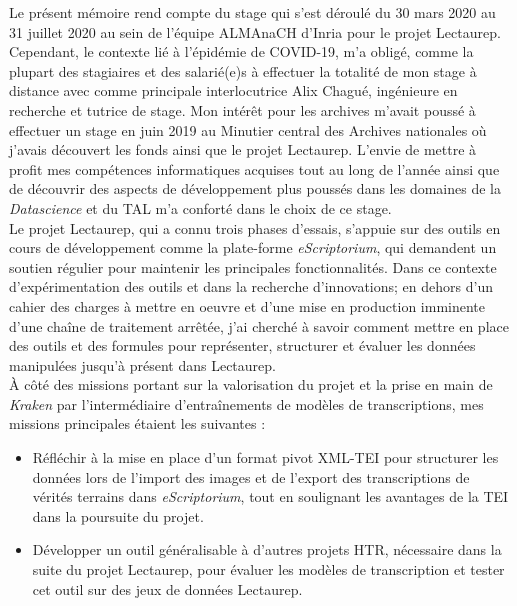 Le présent mémoire rend compte du stage qui s'est déroulé du 30 mars 2020 au 31 juillet 2020 au sein de l'équipe ALMAnaCH d'Inria pour le projet Lectaurep. Cependant, le contexte lié à l'épidémie de COVID-19, m'a obligé, comme la plupart des stagiaires et des salarié(e)s à effectuer la totalité de mon stage à distance avec comme principale interlocutrice Alix Chagué, ingénieure en recherche et tutrice de stage. Mon intérêt pour les archives m'avait poussé à effectuer un stage en juin 2019 au Minutier central des Archives nationales où j'avais découvert les fonds ainsi que le projet Lectaurep. L'envie de mettre à profit mes compétences informatiques acquises tout au long de l'année ainsi que de découvrir des aspects de développement plus poussés dans les domaines de la \textit{Datascience} et du TAL m'a conforté dans le choix de ce stage.\\
\newpage
Le projet Lectaurep, qui a connu trois phases d'essais, s'appuie sur des outils en cours de développement comme la plate-forme \textit{eScriptorium}, qui demandent un soutien régulier pour maintenir les principales fonctionnalités. Dans ce contexte d'expérimentation des outils et dans la recherche d'innovations; en dehors d'un cahier des charges à mettre en oeuvre et d'une mise en production imminente d'une chaîne de traitement arrêtée, j'ai cherché à savoir comment mettre en place des outils et des formules pour représenter, structurer et évaluer les données manipulées jusqu'à présent dans Lectaurep.\\ 

À côté des missions portant sur la valorisation du projet et la prise en main de \textit{Kraken} par l'intermédiaire d'entraînements de modèles de transcriptions, mes missions principales étaient les suivantes : 
\begin{itemize}
    \item Réfléchir à la mise en place d'un format pivot XML-TEI pour structurer les données lors de l'import des images et de l'export des transcriptions de vérités terrains dans \textit{eScriptorium}, tout en soulignant les avantages de la TEI dans la poursuite du projet.
    \item Développer un outil généralisable à d'autres projets HTR, nécessaire dans la suite du projet Lectaurep, pour évaluer les modèles de transcription et tester cet outil sur des jeux de données Lectaurep. 
\end{itemize}


